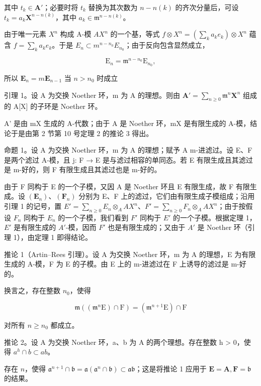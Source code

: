 其中 \(t_k \in \mathbf{A}'\)；必要时将 \(t_k\) 替换为其次数为 \(n - n(k)\) 的齐次分量后，可设 \(t_k = a_k \mathbf{X}^{n - n(k)}\)，其中 \(a_k \in \mathfrak{m}^{n - n(k)}\)。

由于唯一元素 \(X^{n}\) 构成 A-模 \(AX^{n}\) 的一个基，等式 \(f \otimes X^{n} = \left( \sum_{k} a_{k} e_{k} \right) \otimes X^{n}\) 蕴含 \(f = \sum_{k} a_{k} e_{k}\)。于是 \(E_{n} \subset m^{n-n_{0}} E_{n_{0}}\)；由于反向包含显然成立，

\[
\mathrm{E} _ {n} = \mathfrak {m} ^ {n - n _ {0}} \mathrm{E} _ {n _ {0}},
\]

所以 \(\mathbf{E}_n = m\mathbf{E}_{n - 1}\) 当 \(n > n_0\) 时成立

引理 1。设 A 为交换 Noether 环，m 为 A 的理想。则由 \(\mathbf{A}' = \sum_{n\geqslant 0}\mathfrak{m}^n\mathbf{X}^n\) 组成的 A{[}X{]} 的子环是 Noether 环。

A' 是由 mX 生成的 A-代数；由于 A 是 Noether 环，mX 是有限生成的 A-模，结论于是由第 2 节第 10 号定理 2 的推论 3 得出。

命题 1。设 A 为交换 Noether 环，m 为 A 的理想；赋予 A m-进滤过。设 E、F 是两个滤过 A-模，且 j: F → E 是与滤过相容的单同态。若 E 有限生成且其滤过是 m-好的，则 F 有限生成且其滤过也是 m-好的。

由于 F 同构于 E 的一个子模，又因 A 是 Noether 环且 E 有限生成，故 F 有限生成。设 \((\mathbf{E}_{n})\)、\((\mathbf{F}_{n})\) 分别为 E、F 上的滤过，它们由有限生成子模组成；沿用引理 1 的记号，置 \(E' = \sum_{n \geqslant 0} E_{n} \otimes_{A} AX^{n}\)、\(F' = \sum_{n \geqslant 0} F_{n} \otimes_{A} AX^{n}\)；由于按假设 \(F_{n}\) 同构于 \(E_{n}\) 的一个子模，我们看到 \(F'\) 同构于 \(E'\) 的一个子模。根据定理 1，\(E'\) 是有限生成的 \(A'\)-模，因而 \(F'\) 也是有限生成的；又由于 \(A'\) 是 Noether 环（引理 1），由定理 1 即得结论。

推论 1（Artin–Rees 引理）。设 A 为交换 Noether 环，m 为 A 的理想，E 为有限生成的 A-模，F 为 E 的子模。由 E 上的 m-进滤过在 F 上诱导的滤过是 m-好的。

换言之，存在整数 \(n_{0}\)，使得

\[
\mathfrak {m} ((\mathfrak {m} ^ {n} \mathrm{E}) \cap \mathrm{F}) = (\mathfrak {m} ^ {n + 1} \mathrm{E}) \cap \mathrm{F}\tag{1}
\]

对所有 \(n \geqslant n_0\) 都成立。

推论 2。设 A 为交换 Noether 环，a、b 为 A 的两个理想。存在整数 h \textgreater{} 0，使得 \(a^{h} \cap b \subset ab\)。

存在 \(n\)，使得 \(\mathfrak{a}^{n+1} \cap \mathfrak{b} = \mathfrak{a}(\mathfrak{a}^n \cap \mathfrak{b}) \subset \mathfrak{ab}\)；这是将推论 1 应用于 \(\mathbf{E} = \mathbf{A}, \mathbf{F} = \mathfrak{b}\) 的结果。

